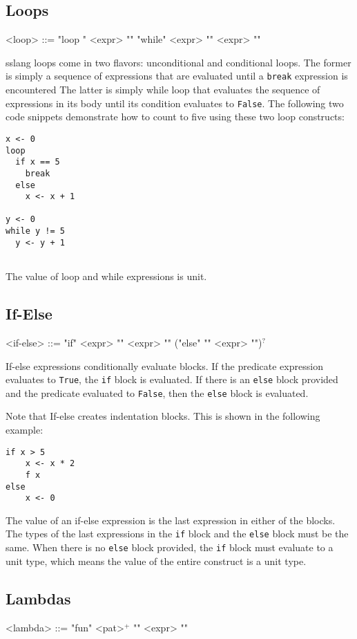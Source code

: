 \documentclass{article}
\begin{document}
\subsection{Loops}
\begin{grammar}
<loop> ::= "loop {" <expr> "}"
\alt "while" <expr> "{" <expr> "}"
\end{grammar}
sslang loops come in two flavors: unconditional and conditional loops. The former is simply a sequence of expressions that are evaluated until a \texttt{break} expression is encountered The latter is simply while loop that evaluates the sequence of expressions in its body until its condition evaluates to \texttt{False}. The following two code snippets demonstrate how to count to five using these two loop constructs:
\begin{lstlisting}
x <- 0
loop
  if x == 5
    break
  else 
    x <- x + 1
    
y <- 0
while y != 5
  y <- y + 1
 
\end{lstlisting}
The value of loop and while expressions is unit.
\subsection{If-Else}
\begin{grammar}
<if-else> ::= "if" <expr> "{" <expr> "}" ("else" "{" <expr> "}")$^{?}$
\end{grammar}
If-else expressions conditionally evaluate blocks. If the predicate expression evaluates to \texttt{True}, the \texttt{if} block is evaluated. If there is an \texttt{else} block provided and the predicate evaluated to \texttt{False}, then the \texttt{else} block is evaluated.

Note that If-else creates indentation blocks. This is shown in the following example:
\begin{lstlisting}
if x > 5
    x <- x * 2
    f x
else
    x <- 0
\end{lstlisting}

The value of an if-else expression is the last expression in either of the blocks. The types of the last expressions in the \texttt{if} block and the \texttt{else} block  must be the same. When there is no \texttt{else} block provided, the \texttt{if} block must evaluate to a unit type, which means the value of the entire construct is a unit type.
\subsection{Lambdas}
\begin{grammar}
<lambda> ::= "fun" <pat>$^{+}$ "{" <expr> "}"
\end{grammar}
\end{document}
